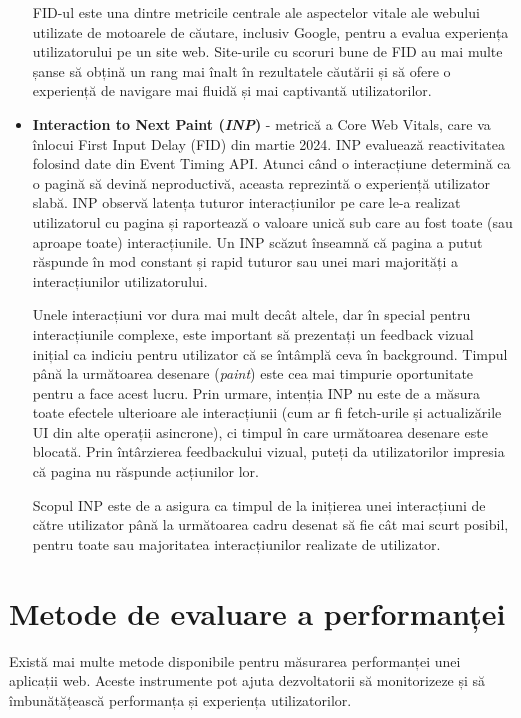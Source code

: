 \documentclass[12pt, a4paper]{report}
\begin{document}
\begin{itemize}
	      FID-ul este una dintre metricile centrale ale aspectelor vitale ale webului utilizate de motoarele de căutare, inclusiv Google, pentru a evalua experiența utilizatorului pe un site web. Site-urile cu scoruri bune de FID au mai multe șanse să obțină un rang mai înalt în rezultatele căutării și să ofere o experiență de navigare mai fluidă și mai captivantă utilizatorilor.
	\item \textbf{Interaction to Next Paint (\emph{INP})} -  metrică a Core Web Vitals, care va înlocui First Input Delay (FID) din martie 2024. INP evaluează reactivitatea folosind date din Event Timing API. Atunci când o interacțiune determină ca o pagină să devină neproductivă, aceasta reprezintă o experiență utilizator slabă. INP observă latența tuturor interacțiunilor pe care le-a realizat utilizatorul cu pagina și raportează o valoare unică sub care au fost toate (sau aproape toate) interacțiunile. Un INP scăzut înseamnă că pagina a putut răspunde în mod constant și rapid tuturor sau unei mari majorități a interacțiunilor utilizatorului.

	      Unele interacțiuni vor dura mai mult decât altele, dar în special pentru interacțiunile complexe, este important să prezentați un feedback vizual inițial ca indiciu pentru utilizator că se întâmplă ceva în background. Timpul până la următoarea desenare (\emph{paint}) este cea mai timpurie oportunitate pentru a face acest lucru. Prin urmare, intenția INP nu este de a măsura toate efectele ulterioare ale interacțiunii (cum ar fi fetch-urile și actualizările UI din alte operații asincrone), ci timpul în care următoarea desenare este blocată. Prin întârzierea feedbackului vizual, puteți da utilizatorilor impresia că pagina nu răspunde acțiunilor lor. \cite{inp}

	      Scopul INP este de a asigura ca timpul de la inițierea unei interacțiuni de către utilizator până la următoarea cadru desenat să fie cât mai scurt posibil, pentru toate sau majoritatea interacțiunilor realizate de utilizator.
\end{itemize}

\section{Metode de evaluare a performanței}

Există mai multe metode disponibile pentru măsurarea performanței unei aplicații web. Aceste instrumente pot ajuta dezvoltatorii să monitorizeze și să îmbunătățească performanța și experiența utilizatorilor.
\end{document}
